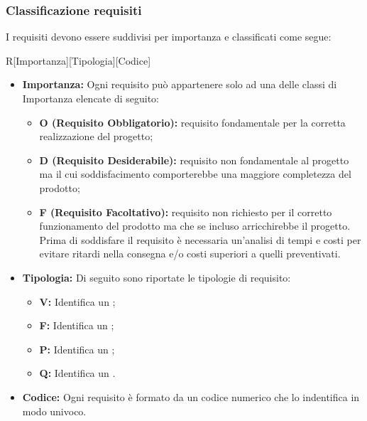 \documentclass[../NomeDocumento.tex]{subfiles}
\begin{document}
	\subsubsection{Classificazione requisiti} 
	
	I requisiti devono essere suddivisi per importanza e classificati come segue:
	
	\begin{center}
		R[Importanza][Tipologia][Codice]
	\end{center}
	
		\begin{itemize}
			\item \textbf{Importanza:} Ogni requisito può appartenere solo ad una delle classi di Importanza elencate di seguito:
			\begin{itemize}
				\item \textbf{O (Requisito Obbligatorio):} requisito fondamentale per la corretta realizzazione del progetto;
				\item \textbf{D (Requisito Desiderabile):} requisito non fondamentale al progetto ma il cui soddisfacimento comporterebbe una maggiore completezza del prodotto;
				\item \textbf{F (Requisito Facoltativo):} requisito non richiesto per il corretto funzionamento del prodotto ma che se incluso arricchirebbe il progetto. Prima di soddisfare il requisito è necessaria un’analisi di tempi e costi per evitare ritardi nella consegna e/o costi superiori a quelli preventivati.
			\end{itemize}
			\item \textbf{Tipologia:} Di seguito sono riportate le tipologie di requisito:
			\begin{itemize}
				\item \textbf{V:} Identifica un ;
				\item \textbf{F:} Identifica un ;
				\item \textbf{P:} Identifica un ;
				\item \textbf{Q:} Identifica un .
			\end{itemize}
		\item \textbf{Codice:} Ogni requisito è formato da un codice numerico che lo indentifica in modo univoco.
		\end{itemize}
	
\end{document}
